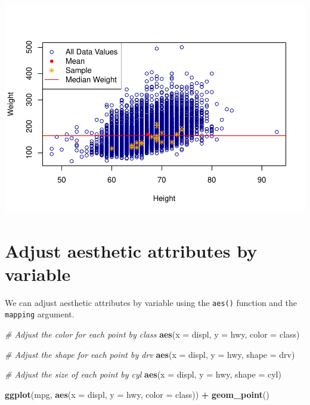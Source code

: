 \documentclass[
]{book}
\newenvironment{Shaded}{\begin{snugshade}}{\end{snugshade}}
\newcommand{\CommentTok}[1]{\textcolor[rgb]{0.56,0.35,0.01}{\textit{#1}}}
\newcommand{\DataTypeTok}[1]{\textcolor[rgb]{0.13,0.29,0.53}{#1}}
\newcommand{\KeywordTok}[1]{\textcolor[rgb]{0.13,0.29,0.53}{\textbf{#1}}}
\newcommand{\NormalTok}[1]{#1}
\newcommand{\OperatorTok}[1]{\textcolor[rgb]{0.81,0.36,0.00}{\textbf{#1}}}
\newcommand{\StringTok}[1]{\textcolor[rgb]{0.31,0.60,0.02}{#1}}
\begin{document}
\includegraphics{_main_files/figure-latex/unnamed-chunk-253-1.pdf}

\hypertarget{adjust-aesthetic-attributes-by-variable}{%
\section{Adjust aesthetic attributes by variable}\label{adjust-aesthetic-attributes-by-variable}}

We can adjust aesthetic attributes by variable using the \texttt{aes()} function and the \texttt{mapping} argument.

\begin{Shaded}
\begin{Highlighting}[]
\CommentTok{# Adjust the color for each point by class}
\KeywordTok{aes}\NormalTok{(}\DataTypeTok{x =}\NormalTok{ displ, }\DataTypeTok{y =}\NormalTok{ hwy, }\DataTypeTok{color =}\NormalTok{ class)}

\CommentTok{# Adjust the shape for each point by drv}
\KeywordTok{aes}\NormalTok{(}\DataTypeTok{x =}\NormalTok{ displ, }\DataTypeTok{y =}\NormalTok{ hwy, }\DataTypeTok{shape =}\NormalTok{ drv)}

\CommentTok{# Adjust the size of each point by cyl}
\KeywordTok{aes}\NormalTok{(}\DataTypeTok{x =}\NormalTok{ displ, }\DataTypeTok{y =}\NormalTok{ hwy, }\DataTypeTok{shape =}\NormalTok{ cyl)}
\end{Highlighting}
\end{Shaded}

\begin{Shaded}
\begin{Highlighting}[]
\KeywordTok{ggplot}\NormalTok{(mpg, }\KeywordTok{aes}\NormalTok{(}\DataTypeTok{x =}\NormalTok{ displ, }\DataTypeTok{y =}\NormalTok{ hwy, }\DataTypeTok{color =}\NormalTok{ class)) }\OperatorTok{+}\StringTok{ }\KeywordTok{geom_point}\NormalTok{()}
\end{Highlighting}
\end{Shaded}
\end{document}
